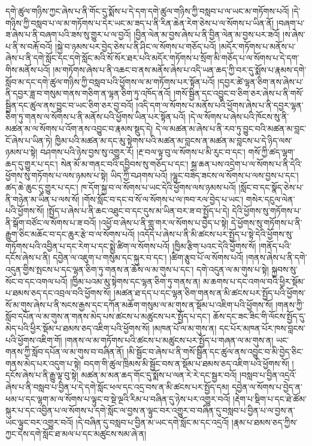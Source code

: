 དགེ་ཚུལ་གཉིས་ཀྱང་ཞེས་པ་ནི་གོང་དུ་སྨོས་པ་དེ་དག་དགེ་ཚུལ་གཉིས་ཀྱི་བསླབ་པ་ལ་ཡང་མ་གཏོགས་པའོ། །དེ་གཉིས་ཀྱི་བསླབ་པ་ལ་མ་གཏོགས་པ་དེར་ཡང་མ་ཟད་པ་ནི་རིན་ཆེན་རེག་ཅེས་པ་ལ་སོགས་པ་ཡིན་ནོ། །བཞག་པ་ཟ་ཞེས་པ་ནི་བཞག་པའི་ཟས་སུ་གྱུར་པ་ལ་བྱའོ། །བྱིན་ལེན་མ་བྱས་ཞེས་པ་ནི་བྱིན་ལེན་མ་བྱས་པར་ཟའོ། །ས་ཞེས་པ་ནི་ས་བརྐོ་བའོ། །སྐྱེ་བ་ཉམས་པར་བྱེད་ཅེས་པ་ནི་ཤིང་ལ་སོགས་པ་གཅོད་པའོ། །མདོར་གཏོགས་པ་མནོས་པ་ཞེས་པ་ནི་དགེ་སློང་དང་དགེ་སློང་མའི་སོ་སོར་ཐར་པའི་མདོར་གཏོགས་པ་སྲོག་མི་གཅོད་པ་ལ་སོགས་པ་དེ་དག་གིས་མནོས་པའོ། །མ་གཏོགས་ཞེས་པ་ནི་འཆང་བ་ནས་མནོས་ཞེས་པ་འདི་ཡན་ཆད་ཀྱི་བར་དུ་སྨོས་པ་རྣམས་དགེ་སློབ་མ་དང་དགེ་ཚུལ་གཉིས་ཀྱི་བསླབ་པའི་ཕྱོགས་ལ་མ་གཏོགས་པར་སྟོན་པའོ། །དབྱར་ཚེ་ལྷན་ཅིག་ནས་ཞེས་པ་ནི་དབྱར་ཟླ་བ་གསུམ་གནས་གཅིག་ན་ལྷན་ཅིག་ཏུ་འཁོད་ནའོ། །གསོ་སྦྱིན་དང་འབྱུང་བ་ཅིག་ཅར་ཞེས་པ་ནི་གསོ་སྦྱིན་དང་ཚུལ་ནས་བྱུང་བ་ཡང་ཅིག་ཅར་བྱ་བའོ། །འདི་དག་ལ་སོགས་པ་མནོས་པའི་ཕྱོགས་ཞེས་པ་ནི་དབྱར་ལྷན་ཅིག་ཏུ་གནས་ལ་སོགས་པ་ནི་མནོས་པའི་ཕྱོགས་ཡིན་པར་སྟོན་པའོ། །དེ་ལ་སོགས་པ་ཞེས་པའི་ཁོངས་སུ་ནི་མཚན་མ་ལ་སོགས་པ་འོག་ནས་འབྱུང་བ་རྣམས་སྡུད་དེ། དེ་ལ་མཚན་མ་ཞེས་པ་ནི་རབ་ཏུ་བྱུང་བའི་མཚན་མ་བླང་ངོ་ཞེས་པ་ཡིན་ཏེ། ཁྱིམ་པའི་མཚན་མ་དང་མུ་སྟེགས་པའི་མཚན་མ་བླངས་ན་མཚན་མ་བླངས་པ་དེ་ཉིད་ལས་ཉམས་པ་སྟེ། བཤགས་པའི་ཉེས་བྱས་སུ་འགྱུར་རོ། །རྔ་བལ་ལྟ་བུ་ལ་སོགས་པ་མི་རུང་བ་དང་། གསོ་ཀྱི་ཚད་ལྷག་ཆད་དུ་གྱུར་པ་དང་། སེན་མོ་མ་གནང་བའི་དབྱིབས་སུ་གཅོད་པ་དང་། སྐྲ་ཆན་པས་འདྲེག་པ་ལ་སོགས་པ་ནི་དེའི་ཕྱོགས་སུ་གཏོགས་པ་ལས་ཉམས་པ་སྟེ། ཡིད་ཀྱི་བཤགས་པའོ། །ལྷུང་བཟེད་ཟངས་ལ་སོགས་པ་ལས་བྱས་པ་དང་། ཚད་ཆེ་ཆུང་དུ་གྱུར་པ་དང་། ཁ་དོག་སྐྱ་བ་ལ་སོགས་པ་ཡང་དེའི་ཕྱོགས་ལས་ཉམས་པའོ། །སློང་བ་དང་སྣོད་ཅེས་པ་ནི་གཉེན་མ་ཡིན་པ་ལས་སོ། །གོས་སློང་བ་དང་བ་སོ་ལ་སོགས་པ་ལ་ཁབ་རལ་བྱེད་པ་ཡང་། གསེར་དངུལ་ལེན་པའི་ཕྱོགས་སོ། །སྤྱོད་པ་ཞེས་པ་ནི་ཆང་འཐུང་བ་དང་དུས་མ་ཡིན་བར་ཟ་བ་སྤྱོད་པ་དེ། དེའི་ཕྱོགས་སུ་གཏོགས་པ་ནི་སྒོག་བཙོང་ལ་སོགས་པ་ཟ་བའོ། །འཕྱོ་བ་ཞེས་པ་ནི་གླུ་གར་ལ་སོགས་པ་བྱེད་པ་སྟེ། དེ་ཕྱོགས་སུ་གཏོགས་པ་ནི་རྒྱུག་ཅིང་མཆོང་བ་དང་ཆུར་རྩེ་བ་ལ་སོགས་པའོ། །འདོད་པ་ཞེས་པ་ནི་མི་ཚངས་པར་སྤྱོད་པ་སྟེ་དེའི་ཕྱོགས་སུ་གཏོགས་པའི་འབྱིན་པ་དང་རེག་པ་དང་སྨྱེ་ཚིག་ལ་སོགས་པའོ། །ཁྱིམ་རྩིག་པའང་དེའི་ཕྱོགས་སོ། །གནོད་པའི་དངོས་ཞེས་པ་ནི། དབྱེན་ལ་འཇུག་པ་གསུམ་དང་སྐུར་བ་དང་། །ཚིག་རྩུབ་པོ་ལ་སོགས་པའོ། །གནས་ཞེས་པ་ནི་དགེ་འདུན་གྱིས་སྤངས་པ་དང་ལྷན་ཅིག་ཏུ་གནས་ན་ཆོས་ལ་མ་གུས་པ་དང་། དགེ་འདུན་ལ་མ་གུས་པ་སྟེ། སྐྱབས་སུ་སོང་བ་དང་འགལ་པའོ། །ཁྱིམ་པའམ་མུ་སྟེགས་དང་ལྷན་ཅིག་ཏུ་གནས་ན། མ་ཆགས་པ་དང་འགལ་བའི་ཕྱིར་སྡོམ་པ་ཐམས་ཅད་དང་འབྲལ་བའི་ཕྱོགས་སོ། །མཚན་ཐ་དད་པ་དང་ལྷན་ཅིག་གནས་ན་མི་ཚངས་པར་སྤྱོད་པའི་ཕྱོགས་སོ་མ་གུས་ཞེས་པ་ནི་སངས་རྒྱས་དང་དཀོན་མཆོག་གསུམ་ལ་མ་གུས་ན་སྡོམ་པ་འཇིག་པའི་ཕྱོགས་སོ། །གནས་ཀྱི་སློབ་དཔོན་ལ་མ་གུས་ན་གནས་མེད་པས་ཚངས་པ་མཚུངས་པར་སྤྱོད་པ་དང་། ཆོས་དང་ཟང་ཟིང་གི་ལོངས་སྤྱོད་དུ་མེད་པའི་ཕྱིར་སྡོམ་པ་ཐམས་ཅད་འཇིག་པའི་ཕྱོགས་སོ། །མཁན་པོ་ལ་མ་གུས་ན། དང་པོར་མཁན་པོར་ཁས་བླངས་པའི་ཕྱོགས་འཇིག་གོ། །གནས་ལ་མ་གཏོགས་པའི་ཚངས་པ་མཚུངས་པར་སྤྱོད་པ་གཞན་ལ་མ་གུས་ན། ཡང་གནས་ཀྱི་སློབ་དཔོན་ལ་མ་གུས་བ་བཞིན་ནོ། །མི་སྦྱོང་བ་ཞེས་པ་ནི་གསོ་སྦྱིན་དང་ཚུལ་ནས་འབྱུང་བ་མི་བྱེད་ཅིང་གནས་མེད་པར་འདུག་པ་སྟེ། བདག་གི་ཚུལ་ཁྲིམས་མི་སྦྱོང་བས་ན་སྡོམ་པ་ཐམས་ཅད་འཇིག་པའི་ཕྱོགས་སོ། །དངོས་ཞེས་པ་ནི་རྒྱུ་ལྟ་བུ་སྟེ། མཚན་མ་མན་ཆད་གོང་དུ་སྨོས་པ་ལན་རེ་རེ་དང་སྦྱར་བའོ། །བསླབ་པ་བྱིན་འདྲའོ་ཞེས་པ་ནི་བསླབ་པ་བྱིན་པ་དེ་དགེ་སློང་ཕལ་དང་འདྲ་བས་ན་མི་ཚངས་པར་སྤྱོད་དམ། དབྱེན་ལ་སོགས་པ་བྱེད་ན་ཕམ་པ་དང་ལྷག་མ་ལ་སོགས་པ་ལྟུང་བ་སྡེ་ལྔའི་རིམ་པ་བཞིན་དུ་ཉེས་པར་འགྱུར་བའོ། །རྡེག་པ་སྡིག་པ་དང་ཐེ་ཚོམ་སྐུར་པ་དང་འབྱིན་པ་ལ་སོགས་པ་དགེ་སློང་ལ་བྱས་ན་ལྟུང་བར་འགྱུར་བ་བཞིན་དུ་བསླབ་པ་བྱིན་པ་ལ་བྱས་ན་ཡང་ལྟུང་བར་འགྱུར་བའོ། །དེ་བཞིན་དུ་བསླབ་པ་བྱིན་མ་ཡང་དགེ་སློང་མ་དང་འདྲའོ། །རྣམ་པ་ཐམས་ཅད་ཀྱིས་ཀྱང་དེས་དགེ་སློང་ཐ་མལ་པ་དང་མཚུངས་སམ་ཞེ་ན། 